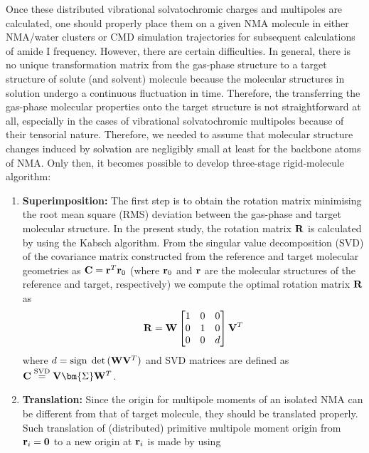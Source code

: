 \documentclass[b5paper,oneside,fleqn,11pt]{book}
\newcommand{\BM}[1]{\bm{#1}}
\begin{document}
\begin{refsection}
Once these distributed vibrational solvatochromic
charges and multipoles are calculated, one should properly
place them on a given NMA molecule in either NMA/water
clusters or CMD simulation trajectories for subsequent calculations
of amide I frequency. However, there are certain
difficulties. In general, there is no unique transformation matrix from the gas\hyp{}phase
structure to a target structure of solute (and solvent) molecule
because the molecular structures in solution
undergo a continuous fluctuation in time.
Therefore, the transferring the gas\hyp{}phase molecular
properties onto the target structure
is not straightforward at all, especially in the cases of vibrational
solvatochromic multipoles because of their tensorial nature.
Therefore, we needed to assume that molecular
structure changes induced by solvation are negligibly small
at least for the backbone atoms of NMA. Only then, it
becomes possible to develop three\hyp{}stage rigid\hyp{}molecule
algorithm:
%
\begin{enumerate}
 \item {\bf Superimposition:} The first step is to obtain
the rotation matrix minimising the root mean square (RMS) deviation
between the gas\hyp{}phase and target molecular structure. 
In the present study, the rotation matrix $\bf R$ is calculated
by using the Kabsch algorithm. \citep{Kabsch.ActCrystSecA.1976} 
From the singular value decomposition
(SVD) of the covariance matrix constructed from the reference and target
molecular geometries as ${\bf C} = {\bf r}^T {\bf r}_0$ (where ${\bf r}_0$
and ${\bf r}$ are
the molecular structures of the reference and target, respectively) we compute
the optimal rotation matrix $\bf R$ as
 \begin{equation}
  {\bf R} = {\bf W} 
 \begin{bmatrix}
1  & 0 & 0\\ 
0  & 1 & 0\\ 
0  & 0 & d
\end{bmatrix}
  {\bf V}^T
 \end{equation}
where $d={\rm sign}\;\det{({\bf W}{\bf V}^T)}$ and SVD matrices are defined as 
${\bf C}\overset{{\rm SVD}}{=} {\bf V}{\BM \Sigma}{\bf W}^T$.
 \item {\bf Translation:} Since the origin for multipole moments
of an isolated NMA can be different from that of
target molecule, they should be translated properly. Such
translation of (distributed) primitive multipole moment
origin from ${\bf r}_i = {\bf 0}$ to a new origin at ${\bf r}_i$ is made by using

\end{enumerate}
\end{refsection}
\end{document}
